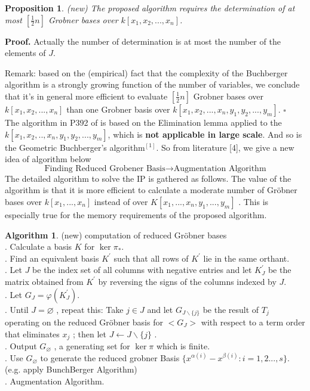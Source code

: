 \documentclass{article}
\theoremstyle{plain}
\newtheorem{proposition}[theorem]{Proposition}
\theoremstyle{definition}
\newtheorem{algorithm}[theorem]{Algorithm}
\begin{document}
\begin{proposition}(new) The proposed algorithm requires the determination of at most $[\frac{1}{2}n]$ Grobner bases over $k[x_1,x_2,...,x_n]$. \end{proposition}

\noindent\textbf{Proof. }Actually the number of determination is at most the number of the elements of $J$.

Remark: based on the (empirical) fact that the complexity of the
Buchberger algorithm is a strongly growing function of the number of variables, we conclude that it's in general more efficient to evaluate $[\frac{1}{2}n]$ Grobner bases over $k[x_1,x_2,...,x_n]$ than one Grobner basis over $k[x_1,x_2,...,x_n,y_1,y_2,...,y_m]$. \hfill $\square$\\

The algorithm in P392 of \cite{ref2} is based on the Elimination lemma applied to the  $k[x_1,x_2,..,x_n,y_1,y_2,...,y_m]$, which is \textbf{not applicable in large scale}. And so is the  Geometric Buchberger’s algorithm$^{[1]}$. So from literature [4], we give a new idea of algorithm below
$$\text{Finding Reduced Grobener Basis}\to \text{Augmentation Algorithm}$$
The detailed algorithm to solve the IP is gathered as follows. The value of the algorithm is that it is more efficient to calculate a moderate number of Gröbner bases over  $k[x_1,...,x_n]$  instead of  over  $K[x_1,...,x_n, y_1,...,y_m]$ . This is especially true for the memory requirements of the proposed algorithm.\\

\begin{algorithm}(new) computation of reduced Gröbner bases \\
. Calculate a basis $K$ for $\operatorname{ker} \pi_{*}$. \\
. Find an equivalent basis  $K^{\prime}$  such that all rows of  $K^{\prime}$  lie in the same orthant. \\
. Let  $J$  be the index set of all columns with negative entries and let  $K_{J}^{\prime}$  be the matrix obtained from  $K^{\prime}$  by reversing the signs of the columns indexed by  $J$.  \\
. Let $G_{J}=\varphi\left(K_{J}^{\prime}\right)$. \\
. Until  $J=\varnothing$ , repeat this: Take  $j \in J$  and let  $G_{J \backslash\{j\}}$  be the result of $T_{j}$ operating on the reduced Gröbner basis for  $<G_{J}>$ with respect to a term order that eliminates  $x_{j}$ ; then let  $J \leftarrow   J \backslash\{j\}$ . \\
. Output  $G_{\varnothing}$ , a generating set for  $\operatorname{ker} \pi $ which is finite.\\
. Use $G_{\varnothing}$ to generate the reduced grobner Basis $\{x^{\alpha(i)}-x^{\beta(i)}:i=1,2...,s\}$. (e.g. apply BunchBerger Algorithm)\\
. Augmentation Algorithm. 
\end{algorithm}
\end{document}
